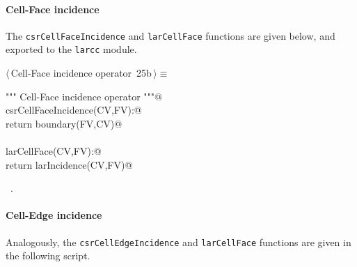 \documentclass[11pt,oneside]{article}    %
\begin{document}
\paragraph{Cell-Face incidence}
The \texttt{csrCellFaceIncidence} and \texttt{larCellFace} functions are given below, and exported to the \texttt{larcc} module.
\begin{flushleft} \small \label{scrap40}
\protect{}$\langle\,$Cell-Face incidence operator\nobreak\ {\footnotesize 25b}$\,\rangle\equiv$
\vspace{-1ex}
\begin{list}{}{} \item
\mbox{}\verb@""" Cell-Face incidence operator """@\\
\mbox{}\verb@def csrCellFaceIncidence(CV,FV):@\\
\mbox{}\verb@    return boundary(FV,CV)@\\
\mbox{}\verb@@\\
\mbox{}\verb@def larCellFace(CV,FV):@\\
\mbox{}\verb@    return larIncidence(CV,FV)@\\
\mbox{}\verb@@{\NWsep}
\end{list}
\vspace{-1ex}
\footnotesize\addtolength{\baselineskip}{-1ex}
\begin{list}{}{\setlength{\itemsep}{-\parsep}\setlength{\itemindent}{-\leftmargin}}
\item \NWtxtMacroRefIn\ .
\end{list}
\end{flushleft}

\paragraph{Cell-Edge incidence}
Analogously, the \texttt{csrCellEdgeIncidence} and \texttt{larCellFace} functions are given in the following script.
\end{document}
